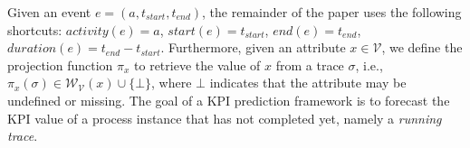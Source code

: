 \documentclass[manuscript,screen,review]{acmart}
\newcommand{\MV}{\mathcal{V}}
\begin{document}
\noindent
Given an event $e=\left(a,t_{start},t_{end}\right)$, the remainder of the paper uses the following shortcuts: $activity\left(e\right)=a$, $start\left(e\right)=t_{start}$, $end\left(e\right)=t_{end}$, $duration\left(e\right)=t_{end}-t_{start}$. Furthermore, given an attribute $x \in \mathcal{V}$, we define the projection function $\pi_x$ to retrieve the value of $x$ from a trace $\sigma$, i.e., $\pi_x(\sigma) \in \mathcal{W}_\mathcal{V}(x) \cup \{\bot\}$, where $\bot$ indicates that the attribute may be undefined or missing. %
The goal of a KPI prediction framework is to forecast the KPI value of a process instance that has not completed yet, namely a \textit{running trace}.

\end{document}
